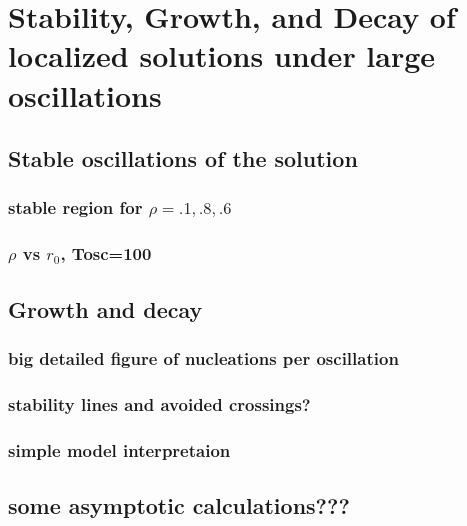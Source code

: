 \documentclass[../main/TimeForcingSHE.tex]{subfiles}
\begin{document}
\section{Stability, Growth, and Decay of localized solutions under large oscillations }
\subsection{Stable oscillations of the solution}
	\subsubsection{stable region for $\rho=.1,.8,.6$}
	\subsubsection{$\rho$ vs $r_0$, Tosc=100}

\subsection{Growth and decay}
	\subsubsection{big detailed figure of nucleations per oscillation}
	\subsubsection{stability lines and avoided crossings?}
	\subsubsection{simple model interpretaion}

\subsection{some asymptotic calculations???}
\end{document}
